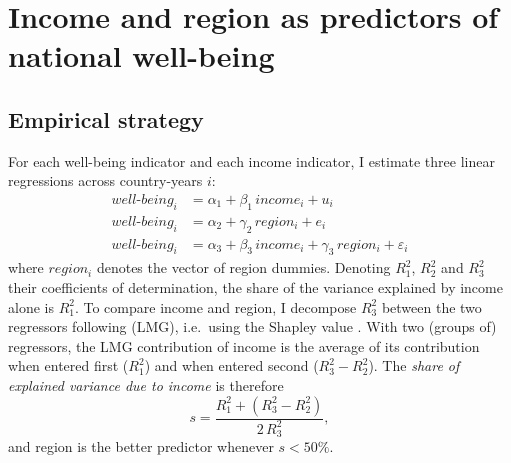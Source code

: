 \documentclass[12pt]{article}
\begin{document}
\section{Income and region as predictors of national well-being}\label{sec:region}
\subsection{Empirical strategy}\label{subsec:method_region}

For each well-being indicator and each income indicator, I estimate three linear regressions across country-years $i$:
\begin{align}
    well\text{-}being_i &= \alpha_1 + \beta_1\, income_i + u_i \label{eq:income}\\
    well\text{-}being_i &= \alpha_2 + \gamma_2\, region_i + e_i \label{eq:region}\\
    well\text{-}being_i &= \alpha_3 + \beta_3\, income_i + \gamma_3\, region_i + \varepsilon_i \label{eq:both}
\end{align}
where $region_i$ denotes the vector of region dummies. Denoting $R^2_1$, $R^2_2$ and $R^2_3$ their coefficients of determination, the share of the variance explained by income alone is $R^2_1$. To compare income and region, I decompose $R^2_3$ between the two regressors following \citet{lindeman_introduction_1980} (LMG), i.e.\ using the Shapley value \citep{gromping_estimators_2007}. With two (groups of) regressors, the LMG contribution of income is the average of its contribution when entered first ($R^2_1$) and when entered second ($R^2_3 - R^2_2$). The \textit{share of explained variance due to income} is therefore
\begin{equation}
    s = \frac{R^2_1 + (R^2_3 - R^2_2)}{2\, R^2_3}, \label{eq:share}
\end{equation}
and region is the better predictor whenever $s < 50\%$.
\end{document}
